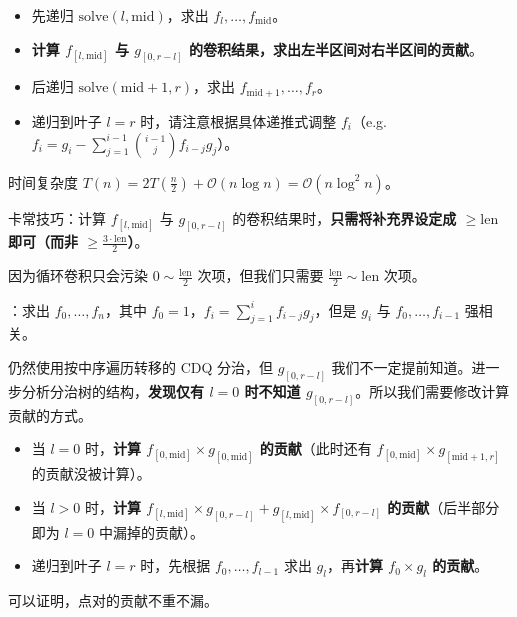 \begin{itemize}
    \item 先递归 $\mathrm{solve}(l, \mathrm{mid})$，求出 $f_l, \dots, f_{\mathrm{mid}}$。
    \item \textbf{计算 $f_{[l, \mathrm{mid}]}$ 与 $g_{[0, r - l]}$ 的卷积结果，求出左半区间对右半区间的贡献}。
    \item 后递归 $\mathrm{solve}(\mathrm{mid} + 1, r)$，求出 $f_{\mathrm{mid} + 1}, \dots, f_r$。
    \item 递归到叶子 $l = r$ 时，请注意根据具体递推式调整 $f_i$（e.g. $f_i = g_i - \sum_{j = 1}^{i - 1} \binom{i - 1}{j} f_{i - j}g_j$）。
\end{itemize}

时间复杂度 $T(n) = 2T\left( \frac{n}{2} \right) + \mathcal{O}(n \log n) = \mathcal{O}(n \log^2 n)$。

\begin{quoteblock}
卡常技巧：计算 $f_{[l, \mathrm{mid}]}$ 与 $g_{[0, r - l]}$ 的卷积结果时，\textbf{只需将补充界设定成 $\geq \mathrm{len}$ 即可（而非 $\geq \frac{3 \cdot \mathrm{len}}{2}$）}。

因为循环卷积只会污染 $0 \sim \frac{\mathrm{len}}{2}$ 次项，但我们只需要 $\frac{\mathrm{len}}{2} \sim \mathrm{len}$ 次项。
\end{quoteblock}

：求出 $f_0, \dots, f_n$，其中 $f_0 = 1$，$f_i = \sum_{j = 1}^i f_{i - j}g_j$，但是 $g_i$ 与 $f_0, \dots, f_{i - 1}$ 强相关。

仍然使用按中序遍历转移的 CDQ 分治，但 $g_{[0, r - l]}$ 我们不一定提前知道。进一步分析分治树的结构，\textbf{发现仅有 $l = 0$ 时不知道 $g_{[0, r - l]}$}。所以我们需要修改计算贡献的方式。

\begin{itemize}
    \item 当 $l = 0$ 时，\textbf{计算 $f_{[0, \mathrm{mid}]} \times g_{[0, \mathrm{mid}]}$ 的贡献}（此时还有 $f_{[0, \mathrm{mid}]} \times g_{[\mathrm{mid} + 1, r]}$ 的贡献没被计算）。
    \item 当 $l > 0$ 时，\textbf{计算 $f_{[l, \mathrm{mid}]} \times g_{[0, r - l]} + g_{[l, \mathrm{mid}]} \times f_{[0, r - l]}$ 的贡献}（后半部分即为 $l = 0$ 中漏掉的贡献）。
    \item 递归到叶子 $l = r$ 时，先根据 $f_0, \dots, f_{l - 1}$ 求出 $g_l$，再\textbf{计算 $f_0 \times g_l$ 的贡献}。
\end{itemize}

可以证明，点对的贡献不重不漏。

